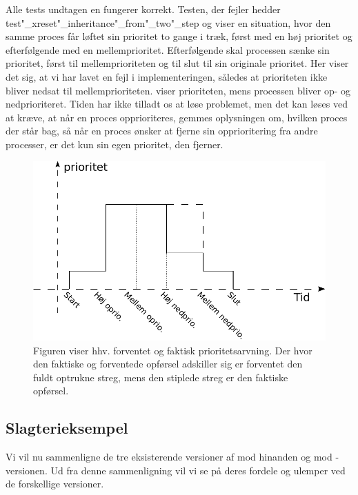  Alle tests undtagen en fungerer korrekt. Testen, der fejler hedder test"_xreset"_inheritance"_from"_two"_step og viser en situation, hvor den samme proces får løftet sin prioritet to gange i træk, først med en høj prioritet og efterfølgende med en mellemprioritet. Efterfølgende skal processen sænke sin prioritet, først til  mellemprioriteten og til slut til sin originale prioritet. Her viser det sig, at vi har lavet en fejl i implementeringen, således at prioriteten ikke bliver nedsat til mellemprioriteten.  viser prioriteten, mens processen bliver op- og nedprioriteret. Tiden har ikke tilladt os at løse problemet, men det kan løses ved at kræve, at når en proces opprioriteres, gemmes oplysningen om, hvilken proces der står bag, så når en proces ønsker at fjerne sin opprioritering fra andre processer, er det kun sin egen  prioritet, den fjerner.  
 
  
\begin{figure}
 \begin{center}
  \includegraphics[scale=1]{images/priority-inheritance}
	\caption{Figuren viser hhv. forventet og faktisk prioritetsarvning. Der hvor den faktiske og forventede opførsel adskiller sig er forventet den fuldt optrukne streg, mens den stiplede streg er den faktiske opførsel.}
	\label{fig:priority-inheritance}
\end{center}
\end{figure}
  

\subsection{Slagterieksempel}

Vi vil nu sammenligne de tre eksisterende versioner af \pycsp mod hinanden og mod -versionen. Ud fra denne sammenligning vil vi  se på deres fordele og ulemper ved de forskellige versioner.

